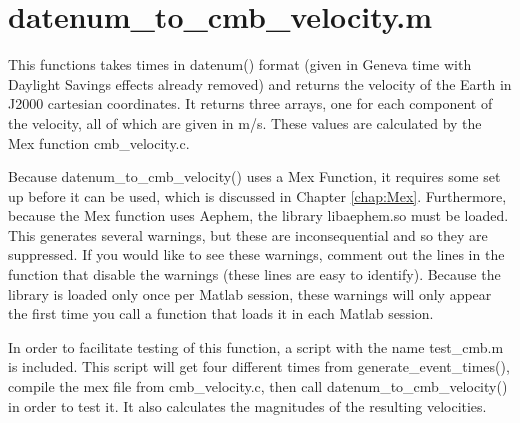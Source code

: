 \documentclass[12pt]{report}
\begin{document}
\section{datenum\_to\_cmb\_velocity.m}
This functions takes times in datenum() format (given in Geneva time with Daylight Savings effects already removed) and returns the velocity of the Earth in J2000 cartesian coordinates.  It returns three arrays, one for each component of the velocity, all of which are given in m/s.  These values are calculated by the Mex function cmb\_velocity.c.  

Because datenum\_to\_cmb\_velocity() uses a Mex Function, it requires some set up before it can be used, which is discussed in Chapter \ref{chap:Mex}.  Furthermore, because the Mex function uses Aephem, the library libaephem.so must be loaded.  This generates several warnings, but these are inconsequential and so they are suppressed.  If you would like to see these warnings, comment out the lines in the function that disable the warnings (these lines are easy to identify).  Because the library is loaded only once per Matlab session, these warnings will only appear the first time you call a function that loads it in each Matlab session.

In order to facilitate testing of this function, a script with the name test\_cmb.m is included.  This script will get four different times from generate\_event\_times(), compile the mex file from cmb\_velocity.c, then call datenum\_to\_cmb\_velocity() in order to test it.  It also calculates the magnitudes of the resulting velocities.
\end{document}
